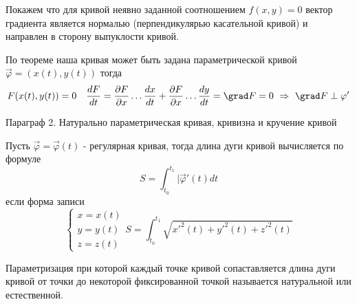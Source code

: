 Покажем что для кривой неявно заданной соотношением $f(x, y) = 0$ вектор
градиента является нормалью (перпендикулярью касательной кривой) и направлен в
сторону выпуклости кривой.

По теореме наша кривая может быть задана параметрической кривой
$\vec \varphi = (x(t), y(t))$ тогда
$$
F(x(t), y(t)) = 0 ~~~
\frac{dF}{dt} = \frac{\partial F}{\partial x} \dots \frac{dx}{dt} +
\frac{\partial F}{\partial x} \dots \frac{dy}{dt} =
\grad F = 0 ~ \Rightarrow ~ \grad F \perp \varphi'
$$

\begin{title}[\Large]
  Параграф 2. Натурально параметрическая кривая, кривизна и кручение кривой
\end{title}

Пусть $\vec \varphi = \vec \varphi(t)$ - регулярная кривая, тогда длина дуги
кривой вычисляется по формуле
$$
S = \int_{t_0}^{t_1} | \vec \varphi'(t) dt
$$
если форма записи
$$
\left\{
\begin{array}{c}
  x = x(t) \\
  y = y(t) \\
  z = z(t)
\end{array}
\right.
S = \int_{t_0}^{t_1} \sqrt{ x'^2(t) + y'^2(t) + z'^2(t)}
$$

\begin{define}
  Параметризация при которой каждый точке кривой сопаставляется длина дуги кривой
  от точки до некоторой фиксированной точкой называется натуральной или
  естественной.
\end{define}

